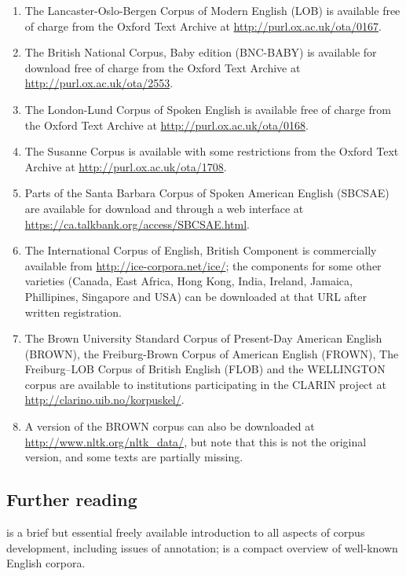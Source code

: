 \begin{enumerate}
  \item The Lancaster-Oslo-Bergen Corpus of Modern English (LOB) is available free of charge from the Oxford Text Archive at \url{http://purl.ox.ac.uk/ota/0167}.
  \item The British National Corpus, Baby edition (BNC-BABY) is available for download free of charge from the Oxford Text Archive at \url{http://purl.ox.ac.uk/ota/2553}.
  \item The London-Lund Corpus of Spoken English is available free of charge from the Oxford Text Archive at \url{http://purl.ox.ac.uk/ota/0168}.
  \item The Susanne Corpus is available with some restrictions from the Oxford Text Archive at \url{http://purl.ox.ac.uk/ota/1708}.
  \item Parts of the Santa Barbara Corpus of Spoken American English (SBCSAE) are available for download and through a web interface at \url{https://ca.talkbank.org/access/SBCSAE.html}.
  \item The International Corpus of English, British Component is commercially available from \url{http://ice-corpora.net/ice/}; the components for some other varieties (Canada, East Africa, Hong Kong, India, Ireland, Jamaica, Phillipines, Singapore and USA) can be downloaded at that URL after written registration.
  \item The Brown University Standard Corpus of Present-Day American English (BROWN), the Freiburg-Brown Corpus of American English (FROWN), The Freiburg–LOB Corpus of British English (FLOB) and the WELLINGTON corpus are available to institutions participating in the CLARIN project at \url{http://clarino.uib.no/korpuskel/}.
  \item A version of the BROWN corpus can also be downloaded at \url{http://www.nltk.org/nltk_data/}, but note that this is not the original version, and some texts are partially missing.
\end{enumerate}

\subsection*{Further reading}

\citet{wynne_developing_2005} is a brief but essential freely available introduction to all aspects of corpus development, including issues of annotation; \citet{ludeling_well-known_2008} is a compact overview of well-known English corpora.


